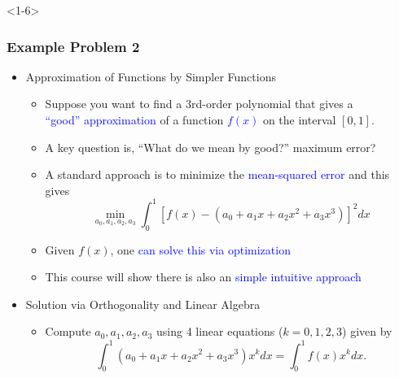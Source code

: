 \documentclass[10pt,english,aspectratio=169]{beamer}
\begin{document}
\begin{frame}<1-6> \frametitle{Example Problem 2}

\begin{itemize}
\item<1-> Approximation of Functions by Simpler Functions \vspace{1mm}

\begin{itemize}
  \setlength\itemsep{3mm}
  \item<1-> Suppose you want to find a 3rd-order polynomial that gives a \\ \textcolor{blue}{``good'' approximation} of a function \textcolor{blue}{$f(x)$} on the interval $[0,1]$.
  
  \item<2-> A key question is, ``What do we mean by good?'' maximum error?
  
  \item<3-> A standard approach is to minimize the \textcolor{blue}{mean-squared error} and this gives
  \[ \min_{a_0,a_1,a_2,a_3} \int_0^1 \left[ f(x) - (a_0+a_1 x+ a_2 x^2+a_3 x^3) \right]^2 dx \]
  
  \item<4-> Given $f(x)$, one \textcolor{blue}{can solve this via optimization}
  
  \item<5-> This course will show there is also an \textcolor{blue}{simple intuitive approach}

\vspace{3mm}

\end{itemize}

\item <6-> Solution via Orthogonality and Linear Algebra \vspace{1mm}

\begin{itemize}
  \setlength\itemsep{3mm}
  \item<6-> Compute $a_0,a_1,a_2,a_3$ using 4 linear equations ($k=0,1,2,3$) given by
  \[ \int_0^1 (a_0+a_1 x+ a_2 x^2+a_3 x^3) x^k dx = \int_0^1 f(x)x^k dx. \]
\end{itemize}
  
\end{itemize}


\end{frame}
\end{document}
